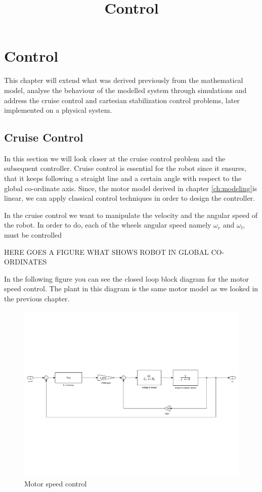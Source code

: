 \chapter{Control}\label{ch:control}

\title{Control}

This chapter will extend what was derived previously from the mathematical model, analyse the behaviour of the modelled system through simulations and address the cruise control and cartesian stabilization control problems, later implemented on a physical system. 

\section{Cruise Control}

In this section we will look closer at the cruise control problem and the subsequent controller. Cruise control is essential for the robot since it ensures, that it keeps following a straight line and a certain angle with respect to the global co-ordinate axis. Since, the motor model derived in chapter \ref{ch:modeling}is linear, we can apply classical control techniques in order to design the controller.

In the cruise control we want to manipulate the velocity and the angular speed of the robot. In order to do, each of the wheels angular speed namely $\omega_{r}$ and $\omega_{l}$, must be controlled 

{\color{red} HERE GOES A FIGURE WHAT SHOWS ROBOT IN GLOBAL CO-ORDINATES}

In the following figure you can see the closed loop block diagram for the motor speed control. The plant in this diagram is the same motor model as we looked in the previous chapter.

\begin{figure}[H]
	\centering
 	\includegraphics[width=1\textwidth]{figures/motorspeedcontrolclosedloop.pdf}
	\caption{Motor speed control} 
 	\label{fig:speedcontrol} 
\end{figure}

